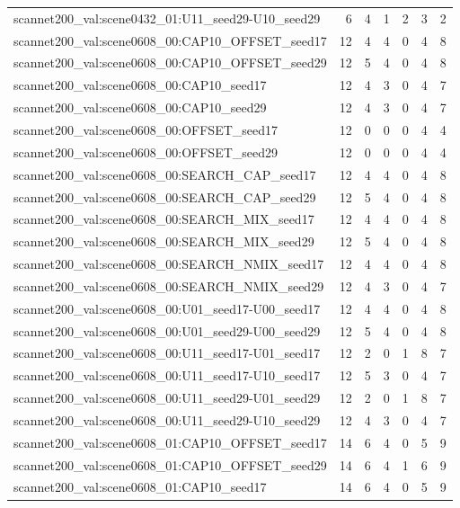 \begin{table}[t]
\begin{tabular}{lrrrrrr}
scannet200\_val:scene0432\_01:U11\_seed29-U10\_seed29 & 6 & 4 & 1 & 2 & 3 & 2 \\
scannet200\_val:scene0608\_00:CAP10\_OFFSET\_seed17 & 12 & 4 & 4 & 0 & 4 & 8 \\
scannet200\_val:scene0608\_00:CAP10\_OFFSET\_seed29 & 12 & 5 & 4 & 0 & 4 & 8 \\
scannet200\_val:scene0608\_00:CAP10\_seed17 & 12 & 4 & 3 & 0 & 4 & 7 \\
scannet200\_val:scene0608\_00:CAP10\_seed29 & 12 & 4 & 3 & 0 & 4 & 7 \\
scannet200\_val:scene0608\_00:OFFSET\_seed17 & 12 & 0 & 0 & 0 & 4 & 4 \\
scannet200\_val:scene0608\_00:OFFSET\_seed29 & 12 & 0 & 0 & 0 & 4 & 4 \\
scannet200\_val:scene0608\_00:SEARCH\_CAP\_seed17 & 12 & 4 & 4 & 0 & 4 & 8 \\
scannet200\_val:scene0608\_00:SEARCH\_CAP\_seed29 & 12 & 5 & 4 & 0 & 4 & 8 \\
scannet200\_val:scene0608\_00:SEARCH\_MIX\_seed17 & 12 & 4 & 4 & 0 & 4 & 8 \\
scannet200\_val:scene0608\_00:SEARCH\_MIX\_seed29 & 12 & 5 & 4 & 0 & 4 & 8 \\
scannet200\_val:scene0608\_00:SEARCH\_NMIX\_seed17 & 12 & 4 & 4 & 0 & 4 & 8 \\
scannet200\_val:scene0608\_00:SEARCH\_NMIX\_seed29 & 12 & 4 & 3 & 0 & 4 & 7 \\
scannet200\_val:scene0608\_00:U01\_seed17-U00\_seed17 & 12 & 4 & 4 & 0 & 4 & 8 \\
scannet200\_val:scene0608\_00:U01\_seed29-U00\_seed29 & 12 & 5 & 4 & 0 & 4 & 8 \\
scannet200\_val:scene0608\_00:U11\_seed17-U01\_seed17 & 12 & 2 & 0 & 1 & 8 & 7 \\
scannet200\_val:scene0608\_00:U11\_seed17-U10\_seed17 & 12 & 5 & 3 & 0 & 4 & 7 \\
scannet200\_val:scene0608\_00:U11\_seed29-U01\_seed29 & 12 & 2 & 0 & 1 & 8 & 7 \\
scannet200\_val:scene0608\_00:U11\_seed29-U10\_seed29 & 12 & 4 & 3 & 0 & 4 & 7 \\
scannet200\_val:scene0608\_01:CAP10\_OFFSET\_seed17 & 14 & 6 & 4 & 0 & 5 & 9 \\
scannet200\_val:scene0608\_01:CAP10\_OFFSET\_seed29 & 14 & 6 & 4 & 1 & 6 & 9 \\
scannet200\_val:scene0608\_01:CAP10\_seed17 & 14 & 6 & 4 & 0 & 5 & 9 \\

\end{tabular}
\end{table}
